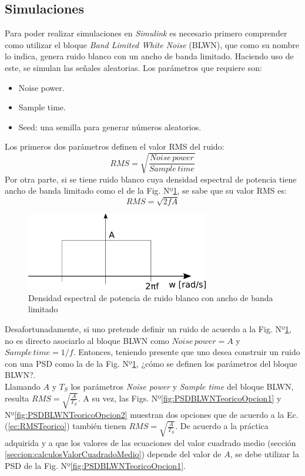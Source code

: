 \documentclass[a4paper,11pt,twoside]{IT-CNEA}
\begin{document}
\subsection{Simulaciones}
Para poder realizar simulaciones en \textit{Simulink} es necesario primero comprender como utilizar el bloque \textit{Band Limited White Noise} (BLWN), que como su nombre lo indica, genera ruido blanco con un ancho de banda limitado. Haciendo uso de este, se simulan las señales aleatorias.
Los parámetros que requiere son:
\begin{itemize}
\item Noise power.
\item Sample time.
\item Seed: una semilla para generar números aleatorios.
\end{itemize}
Los primeros dos parámetros definen el valor RMS del ruido:
\begin{equation}
RMS=\sqrt{\frac{Noise\,power}{Sample\,time}}
\end{equation}
Por otra parte, si se tiene ruido blanco cuya densidad espectral de potencia tiene ancho de banda limitado como el de la Fig. Nº\ref{fig:PSDBLWNTeorico}, se sabe que su valor RMS es:
\begin{equation}
RMS=\sqrt{2fA}
\label{ec:RMSTeorico}
\end{equation}
\begin{figure}[h!]
\centering
\includegraphics[width=8cm]{Figuras/PSDBLWNTeorico.png}
\caption{Densidad espectral de potencia de ruido blanco con ancho de banda limitado}
\label{fig:PSDBLWNTeorico}
\end{figure}
Desafortunadamente, si uno pretende definir un ruido de acuerdo a la Fig. Nº\ref{fig:PSDBLWNTeorico}, no es directo asociarlo al bloque BLWN como $Noise\,power=A$ y $Sample\,time=1/f$. Entonces, teniendo presente que uno desea construir un ruido con una PSD como la de la Fig. Nº\ref{fig:PSDBLWNTeorico}, ¿cómo se definen los parámetros del bloque BLWN?. 
\\Llamando $A$ y $T_S$ los parámetros \textit{Noise power} y \textit{Sample time} del bloque BLWN, resulta $RMS=\sqrt{\frac{A}{T_S}}$. A su vez, las Figs. Nº\ref{fig:PSDBLWNTeoricoOpcion1} y Nº\ref{fig:PSDBLWNTeoricoOpcion2} muestran dos opciones que de acuerdo a la Ec.(\ref{ec:RMSTeorico}) también tienen $RMS=\sqrt{\frac{A}{T_S}}$. De acuerdo a la práctica adquirida y a que los valores de las ecuaciones del valor cuadrado medio (sección \ref{seccion:calculosValorCuadradoMedio}) depende del valor de $A$, se debe utilizar la PSD de la Fig. Nº\ref{fig:PSDBLWNTeoricoOpcion1}.
\end{document}
